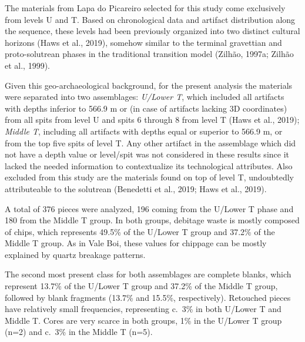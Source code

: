 \documentclass[12pt,twoside]{reedthesis}
\begin{document}
The materials from Lapa do Picareiro selected for this study come exclusively from levels U and T. Based on chronological data and artifact distribution along the sequence, these levels had been previously organized into two distinct cultural horizons (Haws et al., 2019), somehow similar to the terminal gravettian and proto-solutrean phases in the traditional transition model (Zilhão, 1997a; Zilhão et al., 1999).

Given this geo-archaeological background, for the present analysis the materials were separated into two assemblages: \emph{U/Lower T}, which included all artifacts with depths inferior to 566.9 m or (in case of artifacts lacking 3D coordinates) from all spits from level U and spits 6 through 8 from level T (Haws et al., 2019); \emph{Middle T}, including all artifacts with depths equal or superior to 566.9 m, or from the top five spits of level T. Any other artifact in the assemblage which did not have a depth value or level/spit was not considered in these results since it lacked the needed information to contextualize its technological attributes. Also excluded from this study are the materials found on top of level T, undoubtedly attributeable to the solutrean (Benedetti et al., 2019; Haws et al., 2019).

A total of 376 pieces were analyzed, 196 coming from the U/Lower T phase and 180 from the Middle T group. In both groups, debitage waste is mostly composed of chips, which represents 49.5\% of the U/Lower T group and 37.2\% of the Middle T group. As in Vale Boi, these values for chippage can be mostly explained by quartz breakage patterns.

The second most present class for both assemblages are complete blanks, which represent 13.7\% of the U/Lower T group and 37.2\% of the Middle T group, followed by blank fragments (13.7\% and 15.5\%, respectively). Retouched pieces have relatively small frequencies, representing c.~3\% in both U/Lower T and Middle T. Cores are very scarce in both groups, 1\% in the U/Lower T group (n=2) and c.~3\% in the Middle T (n=5).

~
\end{document}
